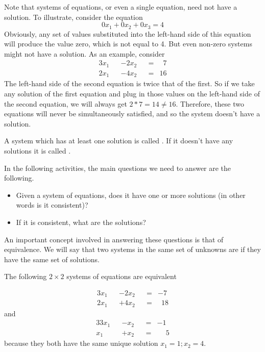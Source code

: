 \documentclass{ximera}
\begin{document}
\begin{example}
  Note that systems of equations, or even a single equation, need not have a solution. To illustrate, consider the equation
  \[
    0x_1 + 0x_2 + 0x_3 = 4
  \]
  Obviously, any set of values substituted into the left-hand side of
  this equation will produce the value zero, which is not equal to
  4. But even non-zero systems might not have a solution. As an
  example, consider
  \begin{alignat*}{3}
    x_1 && - 2x_2 && =& \phantom{1}7 \\
    2x_1 && - 4x_2 && =& 16 
  \end{alignat*}
  The left-hand side of the second equation is twice that of the first. So if we take any solution of the first equation and plug in those values on the left-hand side of the second equation, we will always get $2*7 = 14\ne 16$. Therefore, these two equations will never be simultaneously satisfied, and so the system doesn't have a solution.
\end{example}

\begin{definition}
A system which has at least one solution is called . If it doesn't have any solutions it is called .
\end{definition}

In the following activities, the main questions we need to answer are the following.
\begin{itemize}
\item Given a system of equations, does it have one or more solutions (in other words is it consistent)?
\item If it is consistent, what are the solutions?
\end{itemize}

An important concept involved in answering these questions is that of equivalence. We will say that two systems in the same set of unknowns are  if they have the same set of solutions.

\begin{example} The following $2\times 2$ systems of equations are equivalent

\begin{alignat*}{3}
    x_1 && - 2x_2 && =& -7 \\
    2x_1 && + 4x_2 && =& \phantom{1}18 
  \end{alignat*}
  and \begin{alignat*}{3}
    3x_1 && - x_2 && =& -1 \\
    x_1 && + x_2 && =& \phantom{-}5 
  \end{alignat*}
because they both have the same unique solution $x_1 = 1; x_2 = 4$.
\end{example}
\end{document}
